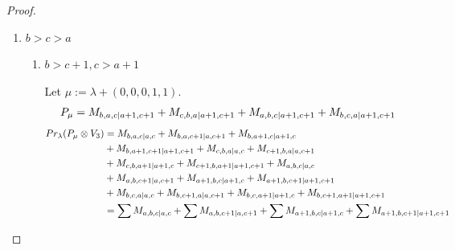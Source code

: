 \begin{proof}
\begin{enumerate}
    \item $b>c>a$
      \begin{enumerate}
        \item $b>c+1,c>a+1$ \par
        Let $\mu:=\lambda + (0,0,0,1,1) $.
        \begin{equation}\notag
          \begin{aligned}
            P_\mu = M_{b,a,c|a+1,c+1}
+ M_{c,b,a|a+1,c+1}
+ M_{a,b,c|a+1,c+1}
+ M_{b,c,a|a+1,c+1}
          \end{aligned}
        \end{equation}
        \begin{equation}\notag
          \begin{aligned}
            Pr_{\lambda}(P_\mu \otimes V_{3}) &=
M_{b,a,c|a,c}
+ M_{b,a,c+1|a,c+1}
+ M_{b,a+1,c|a+1,c}\\
                                              &
+ M_{b,a+1,c+1|a+1,c+1}
+ M_{c,b,a|a,c}
+ M_{c+1,b,a|a,c+1}\\
                                              &
+ M_{c,b,a+1|a+1,c}
+ M_{c+1,b,a+1|a+1,c+1}
+ M_{a,b,c|a,c}\\
                                              &
+ M_{a,b,c+1|a,c+1}
+ M_{a+1,b,c|a+1,c}
+ M_{a+1,b,c+1|a+1,c+1}\\
                                              &
+ M_{b,c,a|a,c}
+ M_{b,c+1,a|a,c+1}
+ M_{b,c,a+1|a+1,c}
+ M_{b,c+1,a+1|a+1,c+1} \\
                                               &=
\sum M_{a,b,c|a,c}
+ \sum M_{a,b,c+1|a,c+1}
+ \sum M_{a+1,b,c|a+1,c}
+ \sum M_{a+1,b,c+1|a+1,c+1}
          \end{aligned}
        \end{equation}


\end{enumerate}
\end{enumerate}
\end{proof}
